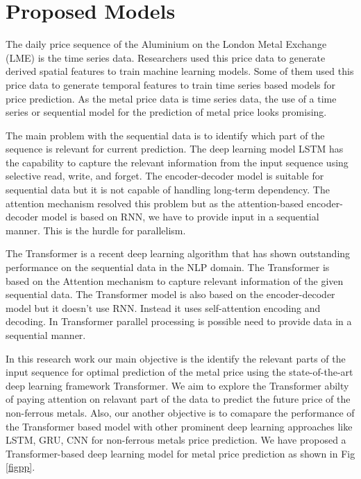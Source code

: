\documentclass{ws-ijait}
\begin{document}
\section{Proposed Models}
The daily price sequence of the Aluminium on the London Metal Exchange (LME) is the time series data.  Researchers used this price data to generate derived spatial features to train machine learning models. Some of them used this price data to generate temporal features to train time series based models for price prediction. As the metal price data is time series data, the use of a time series or sequential model for the prediction of metal price looks promising. 
\par The main problem with the sequential data is to identify which part of the sequence is relevant for current prediction. The deep learning model LSTM has the capability to capture the relevant information from the input sequence using selective read, write, and forget. The encoder-decoder model is suitable for sequential data but it is not capable of handling long-term dependency. The attention mechanism resolved this problem but as the attention-based encoder-decoder model is based on RNN, we have to provide input in a sequential manner. This is the hurdle for parallelism. 
\par The Transformer is a recent deep learning algorithm that has shown outstanding performance on the sequential data in the NLP domain. The Transformer is based on the Attention mechanism to capture relevant information of the given sequential data. The Transformer model is also based on the encoder-decoder model but it doesn't use RNN. Instead it uses self-attention encoding and decoding. In Transformer parallel processing is possible need to provide data in a sequential manner.
\par In this research work our main objective is the identify the relevant parts of the input sequence for optimal prediction of the metal price using the state-of-the-art deep learning framework Transformer. We aim to explore the Transformer abilty of paying attention on relavant part of the data to predict the future price of the non-ferrous metals. Also, our another objective is to comapare the performance of the Transformer based model with other prominent deep learning approaches like LSTM, GRU, CNN for non-ferrous metals price prediction. We have proposed a Transformer-based deep learning model for metal price prediction as shown in Fig \ref{figpp}. 
\end{document}
